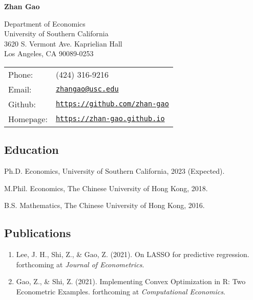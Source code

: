 \documentclass[letterpaper]{article}
\def\name{Zhan Gao}
\renewenvironment{itemize}{
  \begin{list}{}{
    \setlength{\leftmargin}{1.5em}
    \setlength{\itemsep}{0.25em}
    \setlength{\parskip}{0pt}
    \setlength{\parsep}{0.25em}
  }
}{
  \end{list}
}
\begin{document}
{\Huge \bf \name}


\vspace{0.25in}

\begin{minipage}{0.45\linewidth}
  Department of Economics\\
  University of Southern California\\
  3620 S. Vermont Ave. Kaprielian Hall\\
  Los Angeles, CA 90089-0253
\end{minipage}
\begin{minipage}{0.45\linewidth}
  \begin{tabular}{ll}
    Phone: & (424) 316-9216 \\
    Email: & \href{mailto:zhangao@usc.edu}{\tt zhangao@usc.edu} \\
    Github: & \href{https://github.com/zhan-gao}{\tt https://github.com/zhan-gao} \\
    Homepage: & \href{https://zhan-gao.github.io}{\tt https://zhan-gao.github.io}
  \end{tabular}
\end{minipage}




\subsection*{Education}

\begin{itemize}
  \item Ph.D. Economics, University of Southern California, 2023 (Expected).
  \item M.Phil. Economics, The Chinese University of Hong Kong, 2018.
  \item B.S. Mathematics, The Chinese University of Hong Kong, 2016.
\end{itemize}

\subsection*{Publications}
\begin{enumerate}
  \item Lee, J. H., Shi, Z., \& Gao, Z. (2021). On LASSO for predictive regression. forthcoming at \textit{Journal of Econometrics}.
  \item Gao, Z., \& Shi, Z. (2021). Implementing Convex Optimization in R: Two Econometric Examples. forthcoming at {\it Computational Economics}.
\end{enumerate}
 
\end{document}
